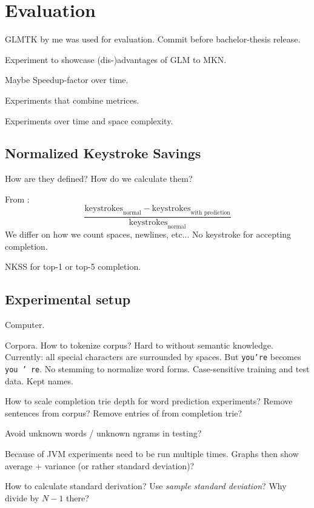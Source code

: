 \chapter{Evaluation}
\label{ch:evaluation}

\begin{draft}
GLMTK by me was used for evaluation.
Commit before bachelor-thesis release.

Experiment to showcase (dis-)advantages of GLM to MKN.

Maybe Speedup-factor over time.

Experiments that combine metrices.

Experiments over time and space complexity.
\end{draft}

\section{Normalized Keystroke Savings}

\begin{draft}
How are they defined?
How do we calculate them?

From \textcite{Trnka2011}:
\begin{equation}
  \frac{\text{keystrokes}_\text{normal} - \text{keystrokes}_\text{with prediction}}
       {\text{keystrokes}_\text{normal}}
\end{equation}
We differ on how we count spaces, newlines, etc...
No keystroke for accepting completion.

NKSS for top-1 or top-5 completion.
\end{draft}

\section{Experimental setup}

\begin{draft}
Computer.

Corpora.
\textcite{OANC}
How to tokenize corpus?
Hard to without semantic knowledge.
Currently: all special characters are surrounded by spaces.
But \texttt{you're} becomes \texttt{you ' re}.
No stemming to normalize word forms.
Case-sensitive training and test data.
Kept names.

How to scale completion trie depth for word prediction experiments?
Remove sentences from corpus?
Remove entries of from completion trie?

Avoid unknown words / unknown ngrams in testing?

Because of JVM experiments need to be run multiple times.
Graphs then show average + variance (or rather standard deviation)?

How to calculate standard derivation?
Use \emph{sample standard deviation}?
Why divide by $N-1$ there?
\end{draft}

